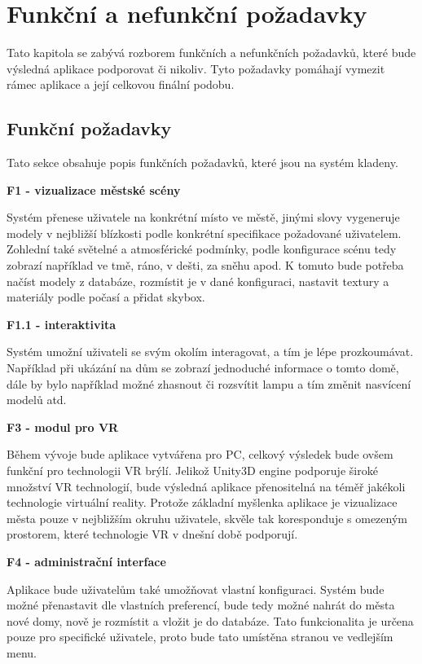 \documentclass[thesis=B,czech]{FITthesis}[2012/06/26]
\begin{document}
		\section{Funkční a nefunkční požadavky}
	Tato kapitola se zabývá rozborem funkčních a nefunkčních požadavků, které bude výsledná aplikace podporovat či nikoliv. Tyto požadavky pomáhají vymezit rámec aplikace a její celkovou finální podobu.
	
	\subsection{Funkční požadavky}	
	Tato sekce obsahuje popis funkčních požadavků, které jsou na systém kladeny.
	
	\begin{description}
	
 		\item \textbf{F1 - vizualizace městské scény}
 		 			
 			Systém přenese uživatele na konkrétní místo ve městě, jinými slovy vygeneruje modely v nejbližší blízkosti podle konkrétní specifikace požadované uživatelem. Zohlední také světelné a atmosférické podmínky, podle konfigurace scénu tedy zobrazí například ve tmě, ráno, v dešti, za sněhu apod. K tomuto bude potřeba načíst modely z databáze, rozmístit je v dané konfiguraci, nastavit textury a materiály podle počasí a přidat skybox.

 		\item \textbf{F1.1 - interaktivita}
 		
 		Systém umožní uživateli se svým okolím interagovat, a tím je lépe prozkoumávat. Například při ukázání na dům se zobrazí jednoduché informace o tomto domě, dále by bylo například možné zhasnout či rozsvítit lampu a tím změnit nasvícení modelů atd.
 		
 		\item \textbf{F3 - modul pro VR}
 		
 		Během vývoje bude aplikace vytvářena pro PC, celkový výsledek bude ovšem funkční pro technologii VR brýlí. Jelikož Unity3D engine podporuje široké množství VR technologií, bude výsledná aplikace přenositelná na téměř jakékoli technologie virtuální reality. Protože základní myšlenka aplikace je vizualizace města pouze v nejbližším okruhu uživatele, skvěle tak koresponduje s omezeným prostorem, které technologie VR v dnešní době podporují.
 		
 		\item \textbf{F4 - administrační interface}
 		
 		Aplikace bude uživatelům také umožňovat vlastní konfiguraci. Systém bude možné přenastavit dle vlastních preferencí, bude tedy možné nahrát do města nové domy, nově je rozmístit a vložit je do databáze. Tato funkcionalita je určena pouze pro specifické uživatele, proto bude tato umístěna stranou ve vedlejším menu.
 	\end{description}	
 		
\end{document}
